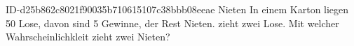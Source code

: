 \begin{exercise}
      {ID-d25b862c8021f90035b710615107c38bbb08eeae}
      {Nieten}
  \ifproblem\problem
    In einem Karton liegen 50 Lose, davon sind 5 Gewinne, der Rest Nieten.
    \xxa{} zieht zwei Lose. Mit welcher Wahrscheinlichkleit zieht \xxa{}
    zwei Nieten?
  \fi
\end{exercise}
